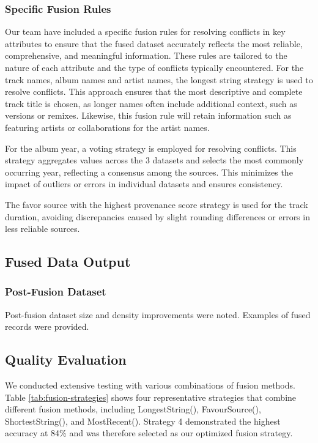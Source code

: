 \documentclass[runningheads]{llncs}
\begin{document}
\subsubsection{Specific Fusion Rules}
Our team have included a specific fusion rules for resolving conflicts in key attributes to ensure that the fused dataset accurately reflects the most reliable, comprehensive, and meaningful information. These rules are tailored to the nature of each attribute and the type of conflicts typically encountered.
For the track names, album names and artist names, the longest string strategy is used to resolve conflicts. This approach ensures that the most descriptive and complete track title is chosen, as longer names often include additional context, such as versions or remixes. Likewise, this fusion rule will
retain information such as featuring artists or collaborations for the artist names.

For the album year, a voting strategy is employed for resolving conflicts. This strategy aggregates values across the 3 datasets and selects the most commonly occurring year, reflecting a consensus among the sources. This minimizes the impact of outliers or errors in individual datasets and ensures consistency.

The favor source with the highest provenance score strategy is used for the track duration, avoiding discrepancies caused by slight rounding differences or errors in less reliable sources.

\subsection{Fused Data Output}
\subsubsection{Post-Fusion Dataset}
Post-fusion dataset size and density improvements were noted. Examples of fused records were provided.

\subsection{Quality Evaluation}
We conducted extensive testing with various combinations of fusion methods. Table \ref{tab:fusion-strategies} shows four representative strategies that combine different fusion methods, including LongestString(), FavourSource(), ShortestString(), and MostRecent(). Strategy 4 demonstrated the highest accuracy at 84\% and was therefore selected as our optimized fusion strategy.
\end{document}

